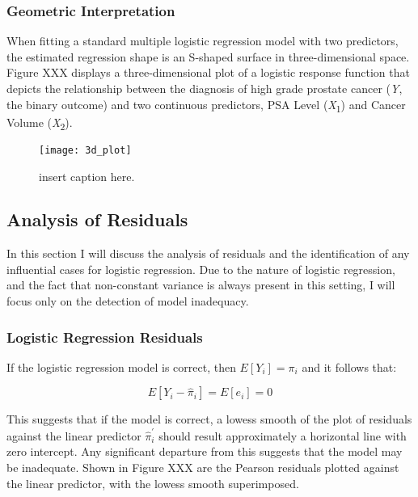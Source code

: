 \subsubsection{Geometric Interpretation}
When fitting a standard multiple logistic regression model with two predictors, the estimated regression shape is an S-shaped surface in three-dimensional space. Figure XXX displays a three-dimensional plot of a logistic response function that depicts the relationship between the diagnosis of high grade prostate cancer (\textit{Y}, the binary outcome) and two continuous predictors, PSA Level (\textit{X}\textsubscript{1}) and Cancer Volume (\textit{X}\textsubscript{2}). 

\begin{figure}[H]
	\centering
	\texttt{[image: 3d\_plot]}
	\caption{insert caption here.}
\end{figure}

\subsection{Analysis of Residuals}
In this section I will discuss the analysis of residuals and the identification of any influential cases for logistic regression. Due to the nature of logistic regression, and the fact that non-constant variance is always present in this setting, I will focus only on the detection of model inadequacy.

\subsubsection{Logistic Regression Residuals}
If the logistic regression model is correct, then \(E[Y_i]=\pi_i\) and it follows that:

\begin{equation}
E[Y_i-\hat{\pi}_i]=E[e_i]=0
\end{equation}

This suggests that if the model is correct, a lowess smooth of the plot of residuals against the linear predictor \(\hat{\pi}^{'}_i\) should result approximately a horizontal line with zero intercept. Any significant departure from this suggests that the model may be inadequate. Shown in Figure XXX are the Pearson residuals plotted against the linear predictor, with the lowess smooth superimposed.

